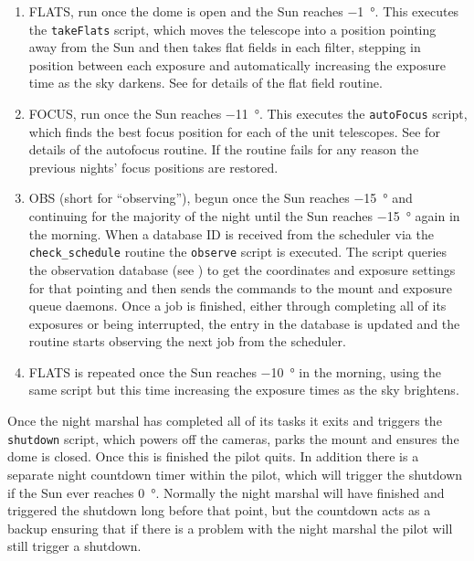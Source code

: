 \begin{colsection}
\begin{colsection}
\begin{enumerate}
\item FLATS, run once the dome is open and the Sun reaches \SI{-1}{\degree}. This executes the \texttt{takeFlats} script, which moves the telescope into a position pointing away from the Sun and then takes flat fields in each filter, stepping in position between each exposure and automatically increasing the exposure time as the sky darkens. See  for details of the flat field routine.

\item FOCUS, run once the Sun reaches \SI{-11}{\degree}. This executes the \texttt{autoFocus} script, which finds the best focus position for each of the unit telescopes. See  for details of the autofocus routine. If the routine fails for any reason the previous nights' focus positions are restored.

\item OBS (short for ``observing''), begun once the Sun reaches \SI{-15}{\degree} and continuing for the majority of the night until the Sun reaches \SI{-15}{\degree} again in the morning. When a database ID is received from the scheduler via the \texttt{check\_schedule} routine the \texttt{observe} script is executed. The script queries the observation database (see ) to get the coordinates and exposure settings for that pointing and then sends the commands to the mount and exposure queue daemons. Once a job is finished, either through completing all of its exposures or being interrupted, the entry in the database is updated and the routine starts observing the next job from the scheduler.

\item FLATS is repeated once the Sun reaches \SI{-10}{\degree} in the morning, using the same script but this time increasing the exposure times as the sky brightens.

\end{enumerate}

Once the night marshal has completed all of its tasks it exits and triggers the \texttt{shutdown} script, which powers off the cameras, parks the mount and ensures the dome is closed. Once this is finished the pilot quits. In addition there is a separate night countdown timer within the pilot, which will trigger the shutdown if the Sun ever reaches \SI{0}{\degree}. Normally the night marshal will have finished and triggered the shutdown long before that point, but the countdown acts as a backup ensuring that if there is a problem with the night marshal the pilot will still trigger a shutdown.


\end{colsection}
\end{colsection}
